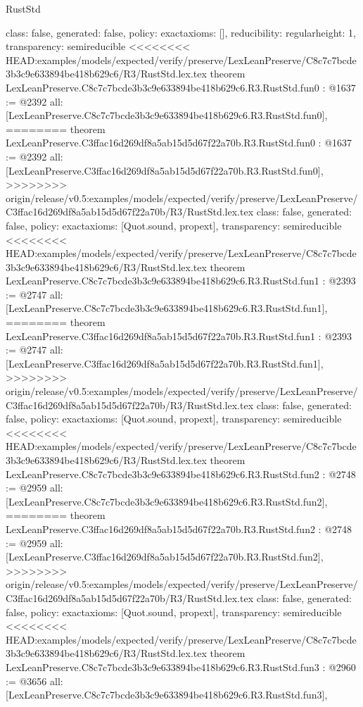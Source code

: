 \begin{lexlean}{RustStd}
\begin{coremodule}
{\begin{coremodule}
{{{  class: false,
  generated: false,
  policy: exact{axioms: []},
  reducibility: regular{height: 1},
  transparency: semireducible
}
<<<<<<<< HEAD:examples/models/expected/verify/preserve/LexLeanPreserve/C8c7c7bcde3b3c9e633894be418b629c6/R3/RustStd.lex.tex
theorem LexLeanPreserve.C8c7c7bcde3b3c9e633894be418b629c6.R3.RustStd.fun0 : @1637 := @2392 {
  all: [LexLeanPreserve.C8c7c7bcde3b3c9e633894be418b629c6.R3.RustStd.fun0],
========
theorem LexLeanPreserve.C3ffac16d269df8a5ab15d5d67f22a70b.R3.RustStd.fun0 : @1637 := @2392 {
  all: [LexLeanPreserve.C3ffac16d269df8a5ab15d5d67f22a70b.R3.RustStd.fun0],
>>>>>>>> origin/release/v0.5:examples/models/expected/verify/preserve/LexLeanPreserve/C3ffac16d269df8a5ab15d5d67f22a70b/R3/RustStd.lex.tex
  class: false,
  generated: false,
  policy: exact{axioms: [Quot.sound, propext]},
  transparency: semireducible
}
<<<<<<<< HEAD:examples/models/expected/verify/preserve/LexLeanPreserve/C8c7c7bcde3b3c9e633894be418b629c6/R3/RustStd.lex.tex
theorem LexLeanPreserve.C8c7c7bcde3b3c9e633894be418b629c6.R3.RustStd.fun1 : @2393 := @2747 {
  all: [LexLeanPreserve.C8c7c7bcde3b3c9e633894be418b629c6.R3.RustStd.fun1],
========
theorem LexLeanPreserve.C3ffac16d269df8a5ab15d5d67f22a70b.R3.RustStd.fun1 : @2393 := @2747 {
  all: [LexLeanPreserve.C3ffac16d269df8a5ab15d5d67f22a70b.R3.RustStd.fun1],
>>>>>>>> origin/release/v0.5:examples/models/expected/verify/preserve/LexLeanPreserve/C3ffac16d269df8a5ab15d5d67f22a70b/R3/RustStd.lex.tex
  class: false,
  generated: false,
  policy: exact{axioms: [Quot.sound, propext]},
  transparency: semireducible
}
<<<<<<<< HEAD:examples/models/expected/verify/preserve/LexLeanPreserve/C8c7c7bcde3b3c9e633894be418b629c6/R3/RustStd.lex.tex
theorem LexLeanPreserve.C8c7c7bcde3b3c9e633894be418b629c6.R3.RustStd.fun2 : @2748 := @2959 {
  all: [LexLeanPreserve.C8c7c7bcde3b3c9e633894be418b629c6.R3.RustStd.fun2],
========
theorem LexLeanPreserve.C3ffac16d269df8a5ab15d5d67f22a70b.R3.RustStd.fun2 : @2748 := @2959 {
  all: [LexLeanPreserve.C3ffac16d269df8a5ab15d5d67f22a70b.R3.RustStd.fun2],
>>>>>>>> origin/release/v0.5:examples/models/expected/verify/preserve/LexLeanPreserve/C3ffac16d269df8a5ab15d5d67f22a70b/R3/RustStd.lex.tex
  class: false,
  generated: false,
  policy: exact{axioms: [Quot.sound, propext]},
  transparency: semireducible
}
<<<<<<<< HEAD:examples/models/expected/verify/preserve/LexLeanPreserve/C8c7c7bcde3b3c9e633894be418b629c6/R3/RustStd.lex.tex
theorem LexLeanPreserve.C8c7c7bcde3b3c9e633894be418b629c6.R3.RustStd.fun3 : @2960 := @3656 {
  all: [LexLeanPreserve.C8c7c7bcde3b3c9e633894be418b629c6.R3.RustStd.fun3],
}}}}}}
\end{coremodule}}
\end{coremodule}
\end{lexlean}
